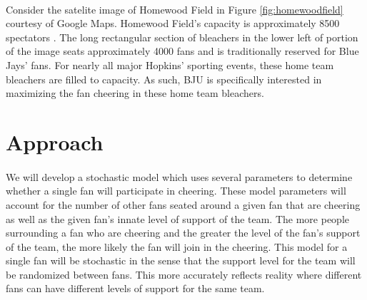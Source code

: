 \documentclass[12pt,letterpaper]{article}
\theoremstyle{definition}
\begin{document}
\paragraph{}
Consider the satelite image of Homewood Field in Figure \ref{fig:homewoodfield} courtesy of Google Maps. Homewood Field's capacity is approximately 8500 spectators \cite{wiki}. The long rectangular section of bleachers in the lower left of portion of the image seats approximately 4000 fans and is traditionally reserved for Blue Jays' fans. For nearly all major Hopkins' sporting events, these home team bleachers are filled to capacity. As such, BJU is specifically interested in maximizing the fan cheering in these home team bleachers. 





\section{Approach}
\paragraph{}
We will develop a stochastic model which uses several parameters to determine whether a single fan will participate in cheering. These model parameters will account for the number of other fans seated around a given fan that are cheering as well as the given fan's innate level of support of the team. The more people surrounding a fan who are cheering and the greater the level of the fan's support of the team, the more likely the fan will join in the cheering. This model for a single fan will be stochastic in the sense that the support level for the team will be randomized between fans. This more accurately reflects reality where different fans can have different levels of support for the same team. 
\end{document}
